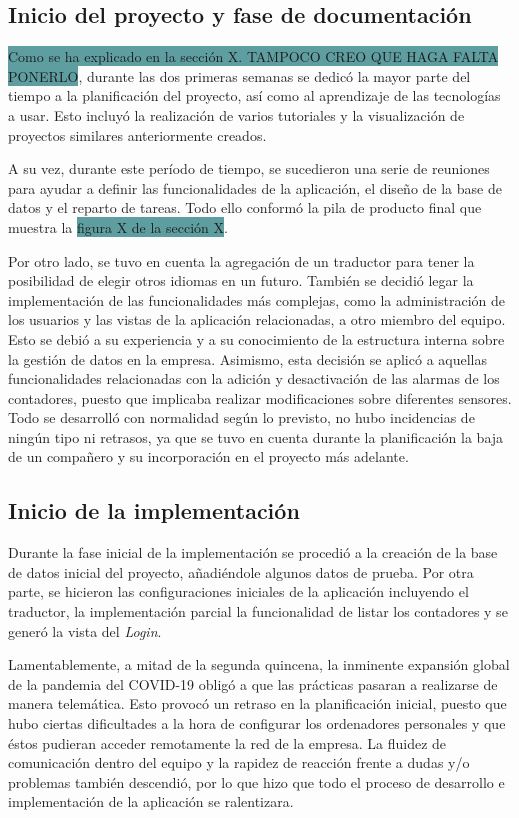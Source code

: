 \documentclass[pdftex,11pt,a4paper]{book}
\begin{document}
\subsection{Inicio del proyecto y fase de documentación}

\colorbox{CadetBlue}{Como se ha explicado en la sección X. TAMPOCO CREO QUE HAGA FALTA PONERLO}, durante las dos primeras semanas se dedicó la mayor parte del tiempo a la planificación del proyecto, así como al aprendizaje de las tecnologías a usar. Esto incluyó la realización de varios tutoriales y la visualización de proyectos similares anteriormente creados. 

A su vez, durante este período de tiempo, se sucedieron una serie de reuniones para ayudar a definir las funcionalidades de la aplicación, el diseño de la base de datos y el reparto de tareas.  Todo ello conformó la pila de producto final que muestra la \colorbox{CadetBlue}{figura X de la sección X}. 

Por otro lado, se tuvo en cuenta la agregación de un traductor para tener la posibilidad de elegir otros idiomas en un futuro. También se decidió legar la implementación de las funcionalidades más complejas, como la administración de los usuarios y las vistas de la aplicación relacionadas, a otro miembro del equipo. Esto se debió a su experiencia y a su conocimiento de la estructura interna sobre la gestión de datos en la empresa. Asimismo, esta decisión se aplicó a aquellas funcionalidades relacionadas con la adición y desactivación de las alarmas de los contadores, puesto que implicaba realizar modificaciones sobre diferentes sensores. 
Todo se desarrolló con normalidad según lo previsto, no hubo incidencias de ningún tipo ni retrasos, ya que se tuvo en cuenta durante la planificación la baja de un compañero y su incorporación en el proyecto más adelante.

\subsection{Inicio de la implementación}

Durante la fase inicial de la implementación se procedió a la creación de la base de datos inicial del proyecto, añadiéndole algunos datos de prueba. Por otra parte, se hicieron las configuraciones iniciales de la aplicación incluyendo el traductor, la implementación parcial la funcionalidad de listar los contadores y se generó la vista del \textit{Login}. 

Lamentablemente, a mitad de la segunda quincena, la inminente expansión global de la pandemia del COVID-19 obligó a que las prácticas pasaran a realizarse de manera telemática. Esto provocó un retraso en la planificación inicial, puesto que hubo ciertas dificultades a la hora de configurar los ordenadores personales y que éstos pudieran acceder remotamente la red de la empresa. La fluidez de comunicación dentro del equipo y la rapidez de reacción frente a dudas y/o problemas también descendió, por lo que hizo que todo el proceso de desarrollo e implementación de la aplicación se ralentizara. 
\end{document}

